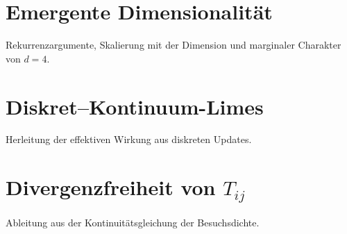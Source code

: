 \documentclass[11pt,a4paper]{article}
\begin{document}
\section{Emergente Dimensionalit\"at}

Rekurrenzargumente, Skalierung mit der Dimension und marginaler Charakter von $d=4$.

\section{Diskret--Kontinuum-Limes}

Herleitung der effektiven Wirkung aus diskreten Updates.

\section{Divergenzfreiheit von $T_{ij}$}

Ableitung aus der Kontinuitätsgleichung der Besuchsdichte.



\end{document}
